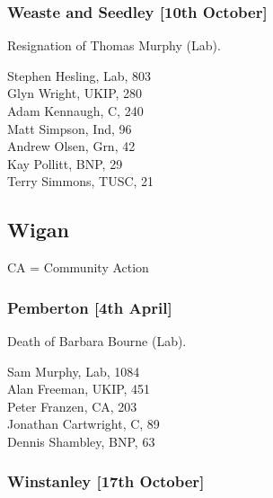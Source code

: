 \documentclass[a4paper,openany,10pt]{book}
\begin{document}
\subsubsection*{Weaste and Seedley \hspace*{\fill}\nolinebreak[1]%
\enspace\hspace*{\fill}
[10th October]}


Resignation of Thomas Murphy (Lab).



Stephen Hesling, Lab, 803\\
Glyn Wright, UKIP, 280\\
Adam Kennaugh, C, 240\\
Matt Simpson, Ind, 96\\
Andrew Olsen, Grn, 42\\
Kay Pollitt, BNP, 29\\
Terry Simmons, TUSC, 21\\


\subsection*{Wigan}

CA = Community Action

\subsubsection*{Pemberton \hspace*{\fill}\nolinebreak[1]%
\enspace\hspace*{\fill}
[4th April]}


Death of Barbara Bourne (Lab).



Sam Murphy, Lab, 1084\\
Alan Freeman, UKIP, 451\\
Peter Franzen, CA, 203\\
Jonathan Cartwright, C, 89\\
Dennis Shambley, BNP, 63\\


\subsubsection*{Winstanley \hspace*{\fill}\nolinebreak[1]%
\enspace\hspace*{\fill}
[17th October]}
\end{document}

